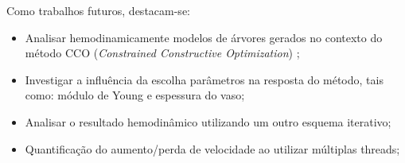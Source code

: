
Como trabalhos futuros, destacam-se:
\begin{itemize}
	\item Analisar hemodinamicamente modelos de árvores gerados no contexto do método CCO (\emph{Constrained Constructive Optimization}) \cite{Karch1999,Queiroz2013,Queiroz2015,Brito2017};
	\item Investigar a influência da escolha parâmetros na resposta do método, tais como: módulo de Young e espessura do vaso;
	\item Analisar o resultado hemodinâmico utilizando um outro esquema iterativo;
	\item Quantificação do aumento/perda de velocidade ao utilizar múltiplas threads;
\end{itemize}